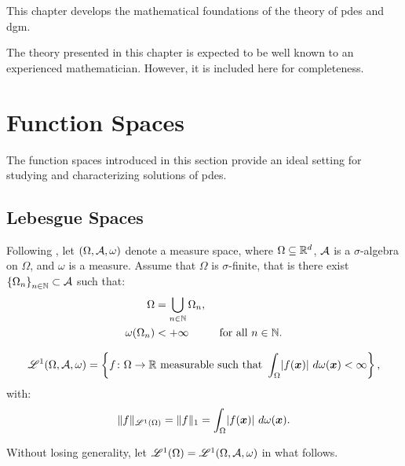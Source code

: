 This chapter develops the mathematical foundations of the theory of \acrfull{pdes} and \acrfull{dgm}.  

The theory presented in this chapter is expected to be well known to an experienced mathematician. However, it is included here for completeness.

\section{Function Spaces}

The function spaces introduced in this section provide an ideal setting for studying and characterizing solutions of \acrshort{pdes}.

\subsection{Lebesgue Spaces} \label{subsection:lebesgue}

Following \cite[p.~89]{Brezis2010}, let $(\Omega, \mathcal{A}, \omega)$ denote a measure space, where $\Omega \subseteq \mathbb{R}^{d}$, $\mathcal{A}$ is a $\sigma$-algebra on $\Omega$, and $\omega$ is a measure. Assume that $\Omega$ is $\sigma$-finite, that is there exist $\left\{ \Omega_n \right\}_{n \in \mathbb{N}} \subset \mathcal{A}$ such that:
\begin{align}
    \Omega & = \bigcup_{n \in \mathbb{N}} \Omega_n, \\
    \omega(\Omega_n) & < +\infty &\text{ for all } n \in \mathbb{N}.
\end{align}

\begin{definition}
    \begin{align}
        \mathscr{L}^{1}(\Omega, \mathcal{A}, \omega) = \left\{ f \colon \Omega \rightarrow \mathbb{R} \text{ measurable such that } \int_{\Omega} \lvert f(\bm{x}) \rvert ~ d \omega(\bm{x}) < \infty \right\},
    \end{align}
    with:
    \begin{align}
    \lVert f \rVert_{\mathscr{L}^{1}(\Omega)} = \lVert f \rVert_{1} = \int_{\Omega} \lvert f(\bm{x}) \rvert ~ d \omega(\bm{x}).
    \end{align}
\end{definition}

Without losing generality, let $\mathscr{L}^{1}(\Omega) = \mathscr{L}^{1}(\Omega, \mathcal{A}, \omega)$ in what follows.

